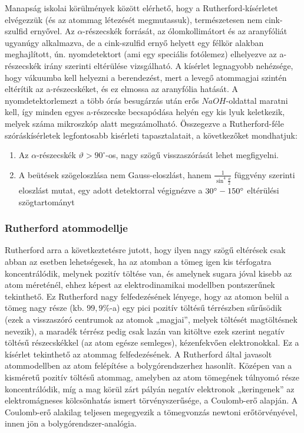 \documentclass[../main.tex]{subfiles}
\begin{document}
Manapság iskolai körülmények között elérhető, hogy a Rutherford-kísérletet
elvégezzük (és az atommag létezését megmutassuk), természetesen nem
cink-szulfid ernyővel.
Az $\alpha$-részecskék forrását, az ólomkollimátort és az aranyfóliát
ugyanúgy alkalmazva, de a cink-szulfid ernyő helyett egy félkör alakban meghajlított, ún. nyomdetektort (ami egy speciális fotólemez)
elhelyezve az a-részecskék irány szerinti eltérülése vizsgálható. A kísérlet
legnagyobb nehézsége, hogy vákuumba kell helyezni a berendezést, mert
a levegő atommagjai szintén eltérítik az a-részecskéket, és ez elmossa az
aranyfólia hatását. A nyomdetektorlemezt a több órás besugárzás után erős
$NaOH$-oldattal maratni kell, így minden egyes a-részecske becsapódása helyén egy kis lyuk keletkezik, melyek száma mikroszkóp alatt megszámolható.
Összegezve a Rutherford-féle szóráskísérletek legfontosabb kisérleti tapasztalatait, a következőket mondhatjuk:
\begin{enumerate}
    \item Az $\alpha$-részecskék $\vartheta > 90^\circ$-os, nagy szögű visszaszórását lehet megfigyelni.
    \item A beütések szögeloszlása nem Gauss-eloszlást, hanem $\frac{1}{\sin^4\frac{\vartheta}{2}}$ függvény szerinti eloszlást mutat, egy adott detektorral végignézve a $30\degree- 150\degree$ eltérülési szögtartományt
\end{enumerate}

\subsubsection{Rutherford atommodellje}
Rutherford arra a következtetésre jutott, hogy ilyen nagy szögű eltérések
csak abban az esetben lehetségesek, ha az atomban a tömeg igen kis
térfogatra koncentrálódik, melynek pozitív töltése van, és amelynek
sugara jóval kisebb az atom méreténél, ehhez képest az elektrodinamikai
modellben pontszerűnek tekinthető.
Ez Rutherford nagy felfedezésének lényege, hogy az atomon belül a tömeg
nagy része (kb. $99{,}9\%$-a) egy pici pozitív töltésű térrészben
sűrűsödik (ezek a visszaszóró centrumok az atomok „magjai”,
melyek töltését magtöltésnek nevezik), a maradék térrész pedig csak
lazán van kitöltve ezek szerint negatív töltésű részecskékkel
(az atom egésze semleges), kézenfekvően elektronokkal.
Ez a kísérlet tekinthető az atommag felfedezésének.
A Rutherford által javasolt atommodellben az atom felépítése a
bolygórendszerhez hasonlít.
Középen van a kisméretű pozitív töltésű atommag, amelyben az atom
tömegének túlnyomó része koncentrálódik, míg a mag körül zárt pályán
negatív elektronok „keringenek” az elektromágneses kölcsönhatás ismert
törvényszerűsége, a Coulomb-erő alapján.
A Coulomb-erő alakilag teljesen megegyezik a tömegvonzás newtoni
erőtörvényével, innen jön a bolygórendszer-analógia.
\end{document}
